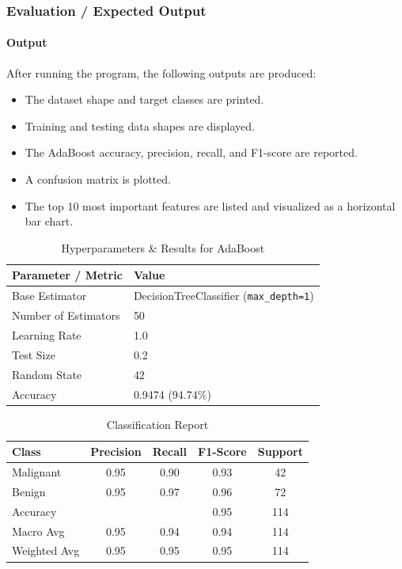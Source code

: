 \documentclass[a4paper,11pt]{article}
\begin{document}
\subsubsection{Evaluation / Expected Output}

\paragraph{Output}
After running the program, the following outputs are produced:
\begin{itemize}
    \item The dataset shape and target classes are printed.
    \item Training and testing data shapes are displayed.
    \item The AdaBoost accuracy, precision, recall, and F1-score are reported.
    \item A confusion matrix is plotted.
    \item The top 10 most important features are listed and visualized as a horizontal bar chart.
\end{itemize}

\begin{table}[H]
\centering
\caption{Hyperparameters \& Results for AdaBoost}
\begin{tabular}{ll}
\toprule
\textbf{Parameter / Metric} & \textbf{Value} \\
\midrule
Base Estimator        & DecisionTreeClassifier (\texttt{max\_depth=1}) \\
Number of Estimators  & 50 \\
Learning Rate         & 1.0 \\
Test Size             & 0.2 \\
Random State          & 42 \\
Accuracy              & 0.9474 (94.74\%) \\
\bottomrule
\end{tabular}
\end{table}

\begin{table}[H]
\centering
\caption{Classification Report}
\begin{tabular}{lcccc}
\toprule
\textbf{Class} & \textbf{Precision} & \textbf{Recall} & \textbf{F1-Score} & \textbf{Support} \\
\midrule
Malignant      & 0.95 & 0.90 & 0.93 & 42 \\
Benign         & 0.95 & 0.97 & 0.96 & 72 \\
\midrule
Accuracy       &      &      & 0.95 & 114 \\
Macro Avg      & 0.95 & 0.94 & 0.94 & 114 \\
Weighted Avg   & 0.95 & 0.95 & 0.95 & 114 \\
\bottomrule
\end{tabular}
\end{table}
\end{document}

